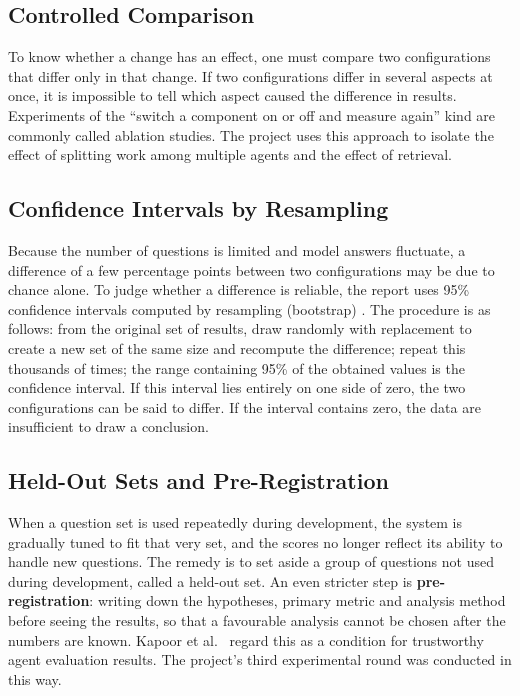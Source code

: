 \subsection{Controlled Comparison}

To know whether a change has an effect, one must compare two configurations that differ only in that change. If two configurations differ in several aspects at once, it is impossible to tell which aspect caused the difference in results. Experiments of the ``switch a component on or off and measure again'' kind are commonly called ablation studies. The project uses this approach to isolate the effect of splitting work among multiple agents and the effect of retrieval.

\subsection{Confidence Intervals by Resampling}

Because the number of questions is limited and model answers fluctuate, a difference of a few percentage points between two configurations may be due to chance alone. To judge whether a difference is reliable, the report uses 95\% confidence intervals computed by resampling (bootstrap) . The procedure is as follows: from the original set of results, draw randomly with replacement to create a new set of the same size and recompute the difference; repeat this thousands of times; the range containing 95\% of the obtained values is the confidence interval. If this interval lies entirely on one side of zero, the two configurations can be said to differ. If the interval contains zero, the data are insufficient to draw a conclusion.

\subsection{Held-Out Sets and Pre-Registration}

When a question set is used repeatedly during development, the system is gradually tuned to fit that very set, and the scores no longer reflect its ability to handle new questions. The remedy is to set aside a group of questions not used during development, called a held-out set. An even stricter step is \textbf{pre-registration}: writing down the hypotheses, primary metric and analysis method before seeing the results, so that a favourable analysis cannot be chosen after the numbers are known. Kapoor et al.\  regard this as a condition for trustworthy agent evaluation results. The project's third experimental round was conducted in this way.

